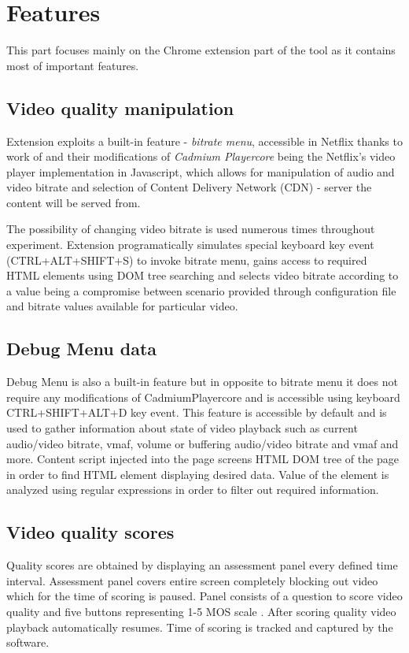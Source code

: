\section{Features}
\label{sec:Features}
    This part focuses mainly on the Chrome extension part of the tool as it contains most of important features.
    
    \subsection{Video quality manipulation}
        Extension exploits a built-in feature - \textit{bitrate menu}, accessible in Netflix thanks to work of \cite{netflix-1080p} and their modifications of \textit{Cadmium Playercore} being the Netflix's video player implementation in Javascript, which allows for manipulation of audio and video bitrate and selection of Content Delivery Network (CDN) - server the content will be served from. 
        
        The possibility of changing video bitrate is used numerous times throughout experiment. 
        Extension programatically simulates special keyboard key event (CTRL+ALT+SHIFT+S) to invoke bitrate menu, gains access to required HTML elements using DOM tree searching and selects video bitrate according to a value being a compromise between scenario provided through configuration file and bitrate values available for particular video. 

    
    \subsection{Debug Menu data}
        Debug Menu is also a built-in feature but in opposite to bitrate menu it does not require any modifications of CadmiumPlayercore and is accessible using keyboard CTRL+SHIFT+ALT+D key event.
        This feature is accessible by default and is used to gather information about state of video playback such as current audio/video bitrate, vmaf, volume or buffering audio/video bitrate and vmaf and more. Content script injected into the page screens HTML DOM tree of the page in order to find HTML element displaying desired data. Value of the element is analyzed using regular expressions in order to filter out required information.

        
    \subsection{Video quality scores}
        Quality scores are obtained by displaying an assessment panel every defined time interval. Assessment panel covers entire screen completely blocking out video which for the time of scoring is paused. Panel consists of a question to score video quality and five buttons representing 1-5 MOS scale \cite{P.800}. After scoring quality video playback automatically resumes. Time of scoring is tracked and captured by the software.
    
